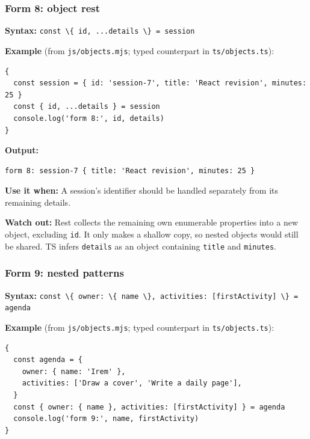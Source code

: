 \documentclass[
  11pt,
]{article}
\newcommand{\passthrough}[1]{#1}
\begin{document}
\subsubsection{Form 8: object rest}\label{form-8-object-rest}

\textbf{Syntax:}
\passthrough{\lstinline!const \{ id, ...details \} = session!}

\textbf{Example} (from \passthrough{\lstinline!js/objects.mjs!}; typed
counterpart in \passthrough{\lstinline!ts/objects.ts!}):

\begin{lstlisting}
{
  const session = { id: 'session-7', title: 'React revision', minutes: 25 }
  const { id, ...details } = session
  console.log('form 8:', id, details)
}
\end{lstlisting}

\textbf{Output:}

\begin{lstlisting}
form 8: session-7 { title: 'React revision', minutes: 25 }
\end{lstlisting}

\textbf{Use it when:} A session's identifier should be handled
separately from its remaining details.

\textbf{Watch out:} Rest collects the remaining own enumerable
properties into a new object, excluding \passthrough{\lstinline!id!}. It
only makes a shallow copy, so nested objects would still be shared. TS
infers \passthrough{\lstinline!details!} as an object containing
\passthrough{\lstinline!title!} and \passthrough{\lstinline!minutes!}.

\subsubsection{Form 9: nested patterns}\label{form-9-nested-patterns}

\textbf{Syntax:}
\passthrough{\lstinline!const \{ owner: \{ name \}, activities: [firstActivity] \} = agenda!}

\textbf{Example} (from \passthrough{\lstinline!js/objects.mjs!}; typed
counterpart in \passthrough{\lstinline!ts/objects.ts!}):

\begin{lstlisting}
{
  const agenda = {
    owner: { name: 'Irem' },
    activities: ['Draw a cover', 'Write a daily page'],
  }
  const { owner: { name }, activities: [firstActivity] } = agenda
  console.log('form 9:', name, firstActivity)
}
\end{lstlisting}
\end{document}
